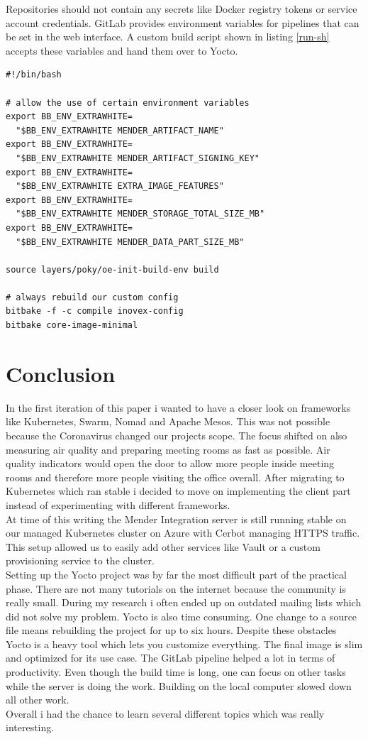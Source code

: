 Repositories should not contain any secrets like Docker registry tokens or service account credentials. GitLab provides environment variables for pipelines that can be set in the web interface. A custom build script shown in listing \ref{run-sh} accepts these variables and hand them over to Yocto.
\begin{code}
  \label{run-sh}
  \begin{verbatim}
#!/bin/bash

# allow the use of certain environment variables
export BB_ENV_EXTRAWHITE=
  "$BB_ENV_EXTRAWHITE MENDER_ARTIFACT_NAME"
export BB_ENV_EXTRAWHITE=
  "$BB_ENV_EXTRAWHITE MENDER_ARTIFACT_SIGNING_KEY"
export BB_ENV_EXTRAWHITE=
  "$BB_ENV_EXTRAWHITE EXTRA_IMAGE_FEATURES"
export BB_ENV_EXTRAWHITE=
  "$BB_ENV_EXTRAWHITE MENDER_STORAGE_TOTAL_SIZE_MB"
export BB_ENV_EXTRAWHITE=
  "$BB_ENV_EXTRAWHITE MENDER_DATA_PART_SIZE_MB"

source layers/poky/oe-init-build-env build

# always rebuild our custom config
bitbake -f -c compile inovex-config
bitbake core-image-minimal
  \end{verbatim}
\end{code}
\newpage

\section{Conclusion}
In the first iteration of this paper i wanted to have a closer look on frameworks like Kubernetes, Swarm, Nomad and Apache Mesos. This was not possible because the Coronavirus changed our projects scope. The focus shifted on also measuring air quality and preparing meeting rooms as fast as possible. Air quality indicators would open the door to allow more people inside meeting rooms and therefore more people visiting the office overall. After migrating to Kubernetes which ran stable i decided to move on implementing the client part instead of experimenting with different frameworks.\\
At time of this writing the Mender Integration server is still running stable on our managed Kubernetes cluster on Azure with Cerbot managing HTTPS traffic. This setup allowed us to easily add other services like Vault or a custom provisioning service to the cluster.\\
Setting up the Yocto project was by far the most difficult part of the practical phase. There are not many tutorials on the internet because the community is really small. During my research i often ended up on outdated mailing lists which did not solve my problem. Yocto is also time consuming. One change to a source file means rebuilding the project for up to six hours. Despite these obstacles Yocto is a heavy tool which lets you customize everything. The final image is slim and optimized for its use case. The GitLab pipeline helped a lot in terms of productivity. Even though the build time is long, one can focus on other tasks while the server is doing the work. Building on the local computer slowed down all other work.\\
Overall i had the chance to learn several different topics which was really interesting.
\newpage
